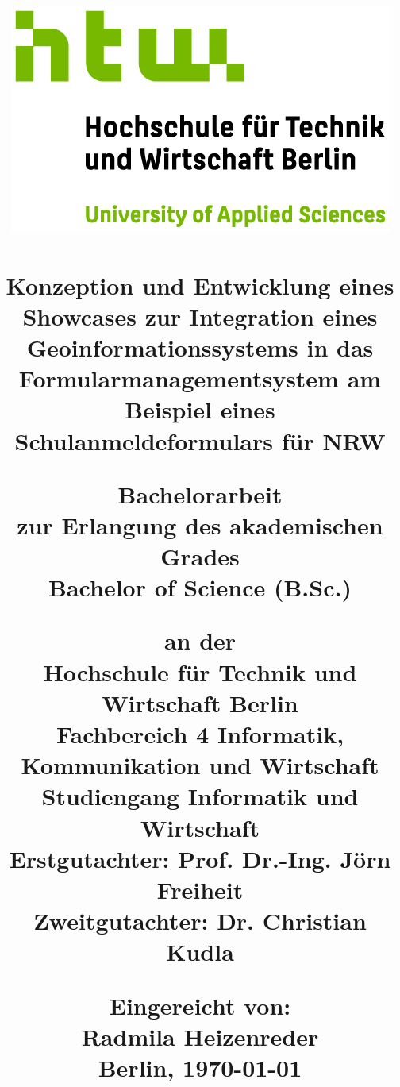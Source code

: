 \begin{titlepage}

\title{
\date{}
\vspace*{-50mm} 
{\includegraphics{images/htw_logo.jpg}}\\

\vspace{1.2cm}
\hrulefill 
\vspace{0.5cm}
\textcolor{htwgreen}{
{\textbf{\Large \\ Konzeption und Entwicklung eines Showcases zur Integration eines Geoinformationssystems in das Formularmanagementsystem am Beispiel eines Schulanmeldeformulars für NRW}}}\\
\hrulefill 
\vspace{0.5cm}

{\normalsize Bachelorarbeit}\\
{\normalsize zur Erlangung des akademischen Grades}\\
{\large Bachelor of Science (B.Sc.) }\\
\vspace{1.2cm}

{\normalsize an der}\\
{\normalsize Hochschule für Technik und Wirtschaft Berlin}\\
{\normalsize Fachbereich 4 Informatik, Kommunikation und Wirtschaft}\\
{\normalsize Studiengang Informatik und Wirtschaft}\\
\vspace{1.2cm}
\normalsize Erstgutachter: Prof. Dr.-Ing. Jörn Freiheit \\
\normalsize Zweitgutachter:  Dr. Christian Kudla \\
\vspace{1.2cm}

\normalsize Eingereicht von:\\
\large Radmila Heizenreder\\
\vspace{0.2cm}
\normalsize Berlin, \today \\
\vspace{-100mm}
}

\maketitle
\end{titlepage}